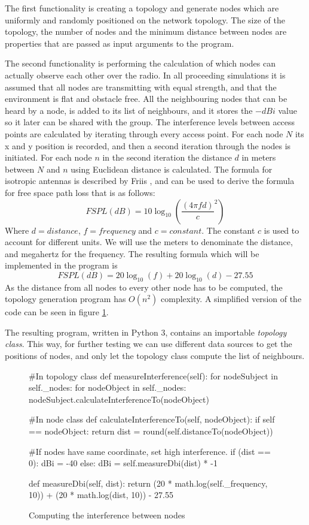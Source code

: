 	The first functionality is creating a topology and generate nodes which are uniformly
	and randomly positioned on the network topology. The size of the topology, the number of nodes and the minimum distance
	between nodes are properties that are passed as input arguments to the program.

	The second functionality is performing the calculation of which nodes can actually observe each other over the radio.
	In all proceeding simulations it is assumed that all nodes are transmitting with equal strength, and that the environment is flat and obstacle free. 
	All the neighbouring nodes that can be heard by a node, is added to its list of neighbours, and it stores the $-dBi$ value so it later can be shared with
	the group. The interference levels between access points are calculated by iterating through every access point. For each node $N$ its x and y position is recorded,
	and then a second iteration through the nodes is initiated. For each node $n$ in the second iteration the distance $d$ in
	meters between $N$ and $n$ using Euclidean distance is calculated. The formula for isotropic antennas is described by Friis \cite{Friis46}, and can be used to
	derive the formula for free space path loss \cite{FSPL} that is as follows:
\[
	FSPL(dB) = 10\log_{10} \left( \frac{ (4 \pi f d)}{c} ^2 \right) 
\]	
	Where $d = distance$, $f = frequency$ and $c=constant$. The constant $c$ is used to account for different units. We will use the meters to denominate the distance,
	and megahertz for the frequency. The resulting formula which will be implemented in the program is
\[
	FSPL(dB) = 20\log_{10}\left( f \right)  + 20\log_{10} \left(d\right) - 27.55
\]	
	As the distance from all nodes to every other node has to be computed, the topology generation program has $O(n^2)$ complexity. A simplified version of the code
	can be seen in figure \ref{fig:dbiCreation}. 

	The resulting program, written in Python 3\cite{Python3}, contains an importable \textit{topology class}. This way, for further testing we can use different data
	sources to get the positions of nodes, and only let the topology class compute the list of neighbours. 
	

	\begin{figure}
		\begin{python}
#In topology class
def measureInterference(self):
 for nodeSubject in self._nodes:  
  for nodeObject in self._nodes:
    nodeSubject.calculateInterferenceTo(nodeObject) 

#In node class
def calculateInterferenceTo(self, nodeObject):
 if self == nodeObject:
  return
 dist = round(self.distanceTo(nodeObject))

#If  nodes have same coordinate, set high interference. 
 if (dist == 0):
  dBi = -40
 else:
  dBi  = self.measureDbi(dist) * -1

def measureDbi(self, dist):
 return (20 * math.log(self._frequency, 10)) + 
(20 * math.log(dist, 10)) - 27.55

\end{python}
\caption{Computing the interference between nodes}
\label{fig:dbiCreation}
\end{figure}

